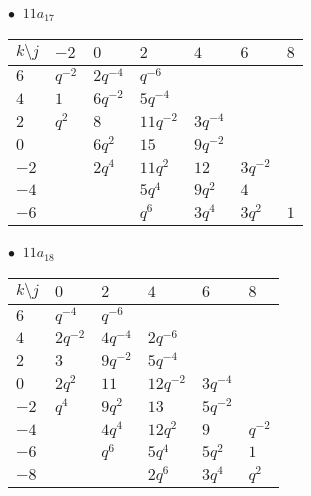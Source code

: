 \begin{minipage}{\linewidth}
$\bullet\ $ $11a_{17}$ \vspace{0.5em} \\
\begin{tabular}{l|llllll}
$k \setminus j$ & $-2$ & $0$ & $2$ & $4$ & $6$ & $8$ \\
\hline
$6$ & $q^{-2}$ & $2q^{-4}$ & $q^{-6}$ &  &  &  \\
$4$ & $1$ & $6q^{-2}$ & $5q^{-4}$ &  &  &  \\
$2$ & $q^{2}$ & $8$ & $11q^{-2}$ & $3q^{-4}$ &  &  \\
$0$ &  & $6q^{2}$ & $15$ & $9q^{-2}$ &  &  \\
$-2$ &  & $2q^{4}$ & $11q^{2}$ & $12$ & $3q^{-2}$ &  \\
$-4$ &  &  & $5q^{4}$ & $9q^{2}$ & $4$ &  \\
$-6$ &  &  & $q^{6}$ & $3q^{4}$ & $3q^{2}$ & $1$ \\
\end{tabular}
\vspace{2em}
\end{minipage}
%
\begin{minipage}{\linewidth}
$\bullet\ $ $11a_{18}$ \vspace{0.5em} \\
\begin{tabular}{l|lllll}
$k \setminus j$ & $0$ & $2$ & $4$ & $6$ & $8$ \\
\hline
$6$ & $q^{-4}$ & $q^{-6}$ &  &  &  \\
$4$ & $2q^{-2}$ & $4q^{-4}$ & $2q^{-6}$ &  &  \\
$2$ & $3$ & $9q^{-2}$ & $5q^{-4}$ &  &  \\
$0$ & $2q^{2}$ & $11$ & $12q^{-2}$ & $3q^{-4}$ &  \\
$-2$ & $q^{4}$ & $9q^{2}$ & $13$ & $5q^{-2}$ &  \\
$-4$ &  & $4q^{4}$ & $12q^{2}$ & $9$ & $q^{-2}$ \\
$-6$ &  & $q^{6}$ & $5q^{4}$ & $5q^{2}$ & $1$ \\
$-8$ &  &  & $2q^{6}$ & $3q^{4}$ & $q^{2}$ \\
\end{tabular}
\vspace{2em}
\end{minipage}
%
